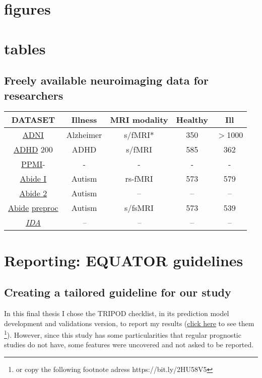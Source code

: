  
		

		
	\section{figures}
	
	\section{tables}
	
	\subsection{Freely available neuroimaging data for researchers} \label{taula_datasets}
	\begin{center}
		\begin{tabular}{c c c c c}
			\hline
			\textbf{DATASET} & \textbf{Illness} & \textbf{MRI modality} & \textbf{Healthy} & \textbf{Ill}\\
			\hline
			\href{https://ida.loni.usc.edu/collaboration/access/appLicense.jsp}{ADNI} & Alzheimer & s/fMRI* & 350 & $>$1000 \\
			\href{https://www.nitrc.org/frs/?group_id=383}{ADHD} 200 & ADHD & s/fMRI & 585 & 362\\
			\href{http://www.ppmi-info.org/data}{PPMI}-&-&-&-&-\\
			\href{http://bit.ly/2nVIgqW}{Abide I} & Autism & rs-fMRI & 573 & 579\\
			\href{http://fcon_1000.projects.nitrc.org/indi/abide/abide_II.html}{Abide 2} & Autism & -- & -- & --\\
			\href{http://preprocessed-connectomes-project.org/abide/}{Abide} \href{https://github.com/preprocessed-connectomes-project/abide}{preproc} & Autism & s/fsMRI & 573 & 539\\
			\hline 
			\href{https://ida.loni.usc.edu/login.jsp}{\textit{IDA}} & \textit{--} & \textit{--} & -- & --\\
			\hline	
		\end{tabular}{}
	\end{center}

	\section{Reporting: EQUATOR guidelines} \label {equator_guidelines}
	
		\subsection{Creating a tailored guideline for our study}
	In this final thesis I chose the {TRIPOD checklist, in its prediction model development and validations version}, to report my results (\href{https://bit.ly/2HU58V5}{click here} to see them \footnote{or copy the following footnote adress https://bit.ly/2HU58V5}). However, since this study has some particularities that regular prognostic studies do not have, some features were uncovered and not asked to be reported. 
	
